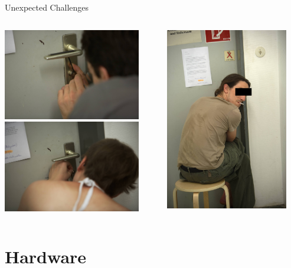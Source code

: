 \documentclass{beamer}
\begin{document}
\begin{frame}{Unexpected Challenges}
  \begin{columns}
    \begin{column}{6cm}
        \includegraphics[height=4cm]{bilder/ipick.jpg}\\
        \includegraphics[height=4cm]{bilder/lpick.jpg}
    \end{column}
    \begin{column}{6cm}
        \includegraphics[height=8cm]{bilder/apick.jpg}
    \end{column}
  \end{columns}
\end{frame}
\section{Hardware}
\end{document}
